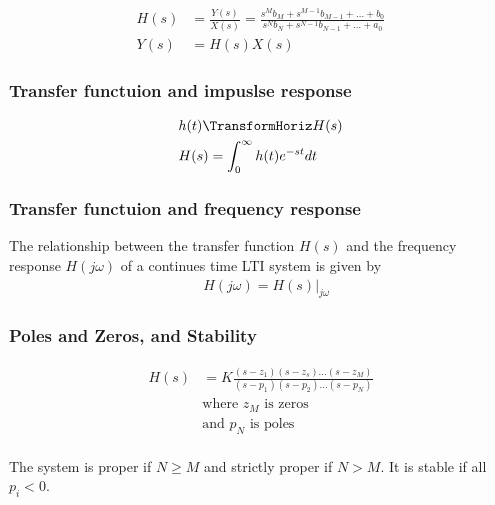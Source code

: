 \documentclass{article}
\begin{document}

\begin{align*}
    H(s) &= \frac{Y(s)}{X(s)}=\frac{s^{M}b_M + s^{M-1}b_{M-1} + \ldots + b_0}{s^{N}b_N + s^{N-1}b_{N-1} + \ldots + a_0} \\
    Y(s) &= H(s)X(s)
\end{align*}

\subsubsection{Transfer functuion and impuslse response}
\begin{align*}
    &h(t) \TransformHoriz H(s) \\
    &H(s) = \int_{0}^{\infty} h(t)e^{-st}dt
\end{align*}

\subsubsection{Transfer functuion and frequency response}
The relationship between the transfer function $H(s)$ and the frequency response 
$H(j\omega)$ of a continues time LTI system is given by 
\begin{align*}
    &H(j\omega) = H(s)|_{j\omega}
\end{align*}

\subsubsection{Poles and Zeros, and Stability}

\begin{align*}
    H(s) &= K\frac{(s-z_1)(s-z_s)\ldots(s-z_M)}{(s-p_1)(s-p_2)\ldots(s-p_N)} \\
    &\text{where $z_M$ is zeros} \\
    &\text{and $p_N$ is poles} \\
\end{align*}

The system is proper if $N\geq M$ and strictly proper if $N>M$. 
It is stable if all $p_i<0$.  \newline
\end{document}
